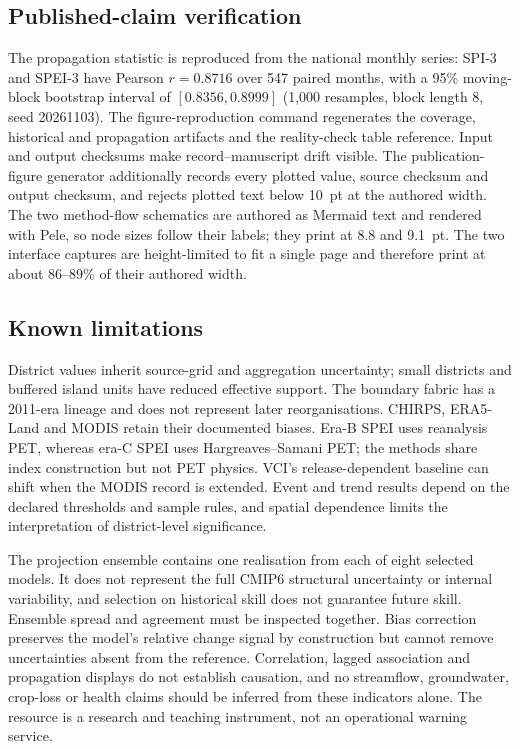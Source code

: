 \documentclass[11pt,a4paper]{article}
\begin{document}
\subsection*{Published-claim verification}
The propagation statistic is reproduced from the national monthly series: SPI-3 and SPEI-3 have Pearson $r=0.8716$ over 547 paired months, with a 95\% moving-block bootstrap interval of $[0.8356,0.8999]$ (1,000 resamples, block length 8, seed 20261103). The figure-reproduction command regenerates the coverage, historical and propagation artifacts and the reality-check table reference. Input and output checksums make record--manuscript drift visible. The publication-figure generator additionally records every plotted value, source checksum and output checksum, and rejects plotted text below 10~pt at the authored width. The two method-flow schematics are authored as Mermaid text and rendered with Pele, so node sizes follow their labels; they print at 8.8 and 9.1~pt. The two interface captures are height-limited to fit a single page and therefore print at about 86--89\% of their authored width.

\subsection*{Known limitations}
District values inherit source-grid and aggregation uncertainty; small districts and buffered island units have reduced effective support. The boundary fabric has a 2011-era lineage and does not represent later reorganisations. CHIRPS, ERA5-Land and MODIS retain their documented biases. Era-B SPEI uses reanalysis PET, whereas era-C SPEI uses Hargreaves--Samani PET; the methods share index construction but not PET physics. VCI's release-dependent baseline can shift when the MODIS record is extended. Event and trend results depend on the declared thresholds and sample rules, and spatial dependence limits the interpretation of district-level significance.

The projection ensemble contains one realisation from each of eight selected models. It does not represent the full CMIP6 structural uncertainty or internal variability, and selection on historical skill does not guarantee future skill. Ensemble spread and agreement must be inspected together. Bias correction preserves the model's relative change signal by construction but cannot remove uncertainties absent from the reference. Correlation, lagged association and propagation displays do not establish causation, and no streamflow, groundwater, crop-loss or health claims should be inferred from these indicators alone. The resource is a research and teaching instrument, not an operational warning service.
\end{document}
